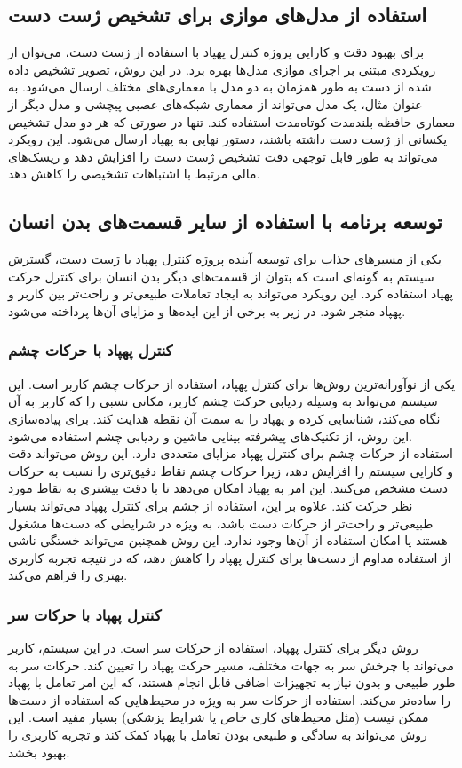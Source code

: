 \subsection{استفاده از مدل‌های موازی برای تشخیص ژست دست}
برای بهبود دقت و کارایی پروژه کنترل پهپاد با استفاده از ژست دست، می‌توان از رویکردی مبتنی بر اجرای موازی مدل‌ها بهره برد. در این روش، تصویر تشخیص داده شده از دست به طور همزمان به دو مدل با معماری‌های مختلف ارسال 
می‌شود. به عنوان مثال، یک مدل می‌تواند از معماری شبکه‌های عصبی پیچشی و مدل دیگر از معماری حافظه بلندمدت کوتاه‌مدت استفاده کند. تنها در صورتی که هر دو مدل تشخیص یکسانی از ژست دست داشته باشند، 
دستور نهایی به پهپاد ارسال می‌شود. این رویکرد می‌تواند به طور قابل توجهی دقت تشخیص ژست دست را افزایش دهد و ریسک‌های مالی مرتبط با اشتباهات تشخیصی را کاهش دهد.

\subsection{توسعه برنامه با استفاده از سایر قسمت‌های بدن انسان}
یکی از مسیرهای جذاب برای توسعه آینده پروژه کنترل پهپاد با ژست دست، گسترش سیستم به گونه‌ای است که بتوان از قسمت‌های دیگر بدن انسان برای کنترل حرکت پهپاد استفاده کرد. این رویکرد می‌تواند به ایجاد تعاملات طبیعی‌تر و راحت‌تر بین کاربر و پهپاد منجر شود. در زیر به برخی از این ایده‌ها و مزایای آن‌ها پرداخته می‌شود.
\\
\subsubsection{کنترل پهپاد با حرکات چشم}
یکی از نوآورانه‌ترین روش‌ها برای کنترل پهپاد، استفاده از حرکات چشم کاربر است. این سیستم می‌تواند به وسیله ردیابی حرکت چشم کاربر، مکانی نسبی را که کاربر به آن نگاه می‌کند، شناسایی کرده و پهپاد را به سمت آن نقطه هدایت کند. برای پیاده‌سازی این روش، از تکنیک‌های پیشرفته بینایی ماشین و ردیابی چشم استفاده می‌شود.
\\
استفاده از حرکات چشم برای کنترل پهپاد مزایای متعددی دارد. این روش می‌تواند دقت و کارایی سیستم را افزایش دهد، زیرا حرکات چشم نقاط دقیق‌تری را نسبت به حرکات دست مشخص می‌کنند. این امر به پهپاد امکان می‌دهد تا با دقت بیشتری به نقاط مورد نظر حرکت کند. علاوه بر این، استفاده از چشم برای 
کنترل پهپاد می‌تواند بسیار طبیعی‌تر و راحت‌تر از حرکات دست باشد، به ویژه در شرایطی که دست‌ها مشغول هستند یا امکان استفاده از آن‌ها وجود ندارد. این روش همچنین می‌تواند خستگی ناشی از استفاده مداوم از دست‌ها برای کنترل پهپاد را کاهش دهد، که در نتیجه تجربه کاربری بهتری را فراهم می‌کند.

\subsubsection{کنترل پهپاد با حرکات سر}
روش دیگر برای کنترل پهپاد، استفاده از حرکات سر است. در این سیستم، کاربر می‌تواند با چرخش سر به جهات مختلف، مسیر حرکت پهپاد را تعیین کند. حرکات سر به طور طبیعی و بدون نیاز به تجهیزات اضافی قابل انجام هستند، که این امر تعامل با پهپاد را
ساده‌تر می‌کند. استفاده از حرکات سر به ویژه در محیط‌هایی که استفاده از دست‌ها ممکن نیست (مثل محیط‌های کاری خاص یا شرایط پزشکی) بسیار مفید است. این روش می‌تواند به سادگی و طبیعی بودن تعامل با پهپاد کمک کند و تجربه کاربری را بهبود بخشد.

